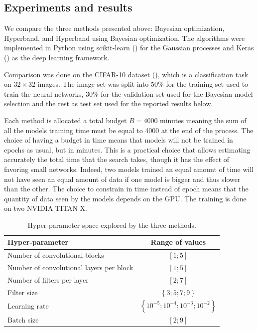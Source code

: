 \subsection{Experiments and results}

We compare the three methods presented above: Bayesian optimization, Hyperband, and Hyperband using Bayesian optimization. The algorithms were implemented in Python using scikit-learn (\textcite{pedregosa2011sklearn}) for the Gaussian processes and Keras (\textcite{chollet2015keras}) as the deep learning framework.

Comparison was done on the CIFAR-10 dataset (\textcite{krizhevsky2009}), which is a classification task on $32 \times 32$ images. The image set was split into $50\%$ for the training set used to train the neural networks, $30\%$ for the validation set used for the Bayesian model selection and the rest as test set used for the reported results below. 

Each method is allocated a total budget $B = 4000$ minutes meaning the sum of all the models training time must be equal to 4000 at the end of the process. The choice of having a budget in time means that models will not be trained in epochs as usual, but in minutes. This is a practical choice that allows estimating accurately the total time that the search takes, though it has the effect of favoring small networks. Indeed, two models trained an equal amount of time will not have seen an equal amount of data if one model is bigger and thus slower than the other. The choice to constrain in time instead of epoch means that the quantity of data seen by the models depends on the GPU. The training is done on two NVIDIA TITAN X.

\begin{table}[htbp]
	\centering
	\begin{tabular}{ | l | c | }
		\hline
		Hyper-parameter & Range of values \\ \hline
		Number of convolutional blocks & $\left[ 1; 5\right]$ \\
		Number of convolutional layers per block & $\left[ 1; 5\right]$ \\
		Number of filters per layer & $\left[ 2; 7\right]$ \\
		Filter size & $\left\{ 3; 5; 7; 9 \right\}$ \\
		Learning rate & $\left\{ 10^{-5}; 10^{-4}; 10^{-3}; 10^{-2} \right\}$ \\
		Batch size & $\left[ 2; 9\right]$ \\
		\hline
	\end{tabular}
	\caption{Hyper-parameter space explored by the three methods.}
	\label{table:hyperspace_combine}
\end{table}

